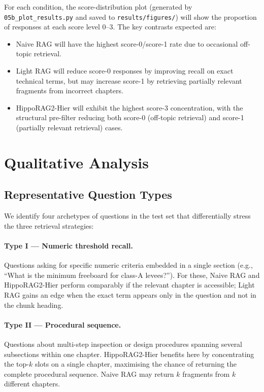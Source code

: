 \documentclass[twocolumn]{article}
\begin{document}
For each condition, the score-distribution plot (generated by
\texttt{05b\_plot\_results.py} and saved to \texttt{results/figures/})
will show the proportion of responses at each score level 0--3.
The key contrasts expected are:
\begin{itemize}
  \item Naive RAG will have the highest score-0/score-1 rate due to occasional
        off-topic retrieval.
  \item Light RAG will reduce score-0 responses by improving recall on exact
        technical terms, but may increase score-1 by retrieving partially relevant
        fragments from incorrect chapters.
  \item HippoRAG2-Hier will exhibit the highest score-3 concentration, with
        the structural pre-filter reducing both score-0 (off-topic retrieval)
        and score-1 (partially relevant retrieval) cases.
\end{itemize}

\section{Qualitative Analysis}
\label{sec:analysis}

\subsection{Representative Question Types}

We identify four archetypes of questions in the test set
that differentially stress the three retrieval strategies:

\paragraph{Type I --- Numeric threshold recall.}
Questions asking for specific numeric criteria embedded in a single section
(e.g., ``What is the minimum freeboard for class-A levees?'').
For these, Naive RAG and HippoRAG2-Hier perform comparably if the relevant
chapter is accessible; Light RAG gains an edge when the exact term appears
only in the question and not in the chunk heading.

\paragraph{Type II --- Procedural sequence.}
Questions about multi-step inspection or design procedures spanning several
subsections within one chapter.
HippoRAG2-Hier benefits here by concentrating the top-$k$ slots on a single
chapter, maximising the chance of returning the complete procedural sequence.
Naive RAG may return $k$ fragments from $k$ different chapters.
\end{document}
